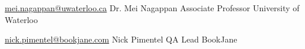 

\begin{cventries}

  \cventry
    {\href{mailto:mei.nagappan@uwaterloo.ca}{mei.nagappan@uwaterloo.ca}} %
    {Dr. Mei Nagappan} %
    {Associate Professor} %
    {University of Waterloo} %

  \cventry
    {\href{mailto:nick.pimentel@bookjane.com}{nick.pimentel@bookjane.com}} %
    {Nick Pimentel} %
    {QA Lead} %
    {BookJane} %

\end{cventries}
